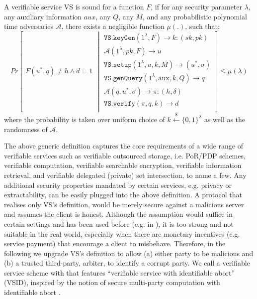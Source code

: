
\begin{definition}[VS Soundness] A verifiable service VS is sound  for a function $F$, if for  any security parameter $\lambda$, any auxiliary information $aux$, any  $Q$,  any $M$, and any probabilistic polynomial time adversaries $\mathcal{A}$, there exists a negligible function $\mu(.)$, such that: 
\small{
$$ Pr\left[
  \begin{array}{l}
F(u^{\scriptscriptstyle *},q)\neq h \wedge d=1
\end{array} \middle | 
    \begin{array} {l}
 \mathtt{VS.keyGen}(1^{\lambda},F)\rightarrow k:(sk,pk)\\
 \mathcal{A}(1^{\scriptscriptstyle\lambda},pk, F)\rightarrow u\\
\mathtt{VS.setup}(1^{\lambda}, u,k,M)\rightarrow (u^{\scriptscriptstyle *},\sigma)\\
 \mathtt{VS.genQuery}(1^{\lambda}, \text{aux},k,Q)\rightarrow q\\
 \mathcal{A}(q,u^{\scriptscriptstyle *},\sigma)\rightarrow \pi:(h,\delta)\\
 \mathtt{VS.verify}(\pi,q,k)\rightarrow d\\
\end{array}    \right]\leq \mu(\lambda)$$
}
where the probability is taken over uniform  choice of $k\stackrel{\scriptscriptstyle\$}\leftarrow \{0,1\}^{\scriptscriptstyle\lambda}$  as well as the randomness of $\mathcal{A}$.
\end{definition}




The above generic definition captures the core requirements of a wide range of verifiable services such as verifiable outsourced storage, i.e. PoR/PDP schemes, verifiable computation, verifiable searchable encryption, verifiable information retrieval, and verifiable delegated (private) set intersection, to name a few. Any additional security properties mandated by certain services, e.g.  privacy or extractability, can be easily plugged into the above definition.  
A protocol that realises only VS's definition, would be merely secure against a malicious server and  assumes the client is honest.  Although the  assumption would suffice in certain settings and has been used before (e.g. in \cite{}), it is too strong and not suitable in the real world, especially when there are monetary incentives (e.g. service payment)  that encourage a client to misbehave. Therefore, in the following we upgrade VS's definition to allow  (a) either party to be malicious and (b)  a trusted third-party, arbiter, to identify a corrupt party. We call a verifiable service scheme with that features ``verifiable service with identifiable abort'' (VSID), inspired by the notion of secure multi-party computation with identifiable abort \cite{DBLP:conf/crypto/IshaiOZ14}. 






